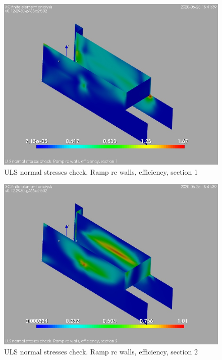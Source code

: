 \begin{figure}
\begin{center}
\includegraphics[width=\linewidth]{ramp_wall/resLC/text/graphics/normStrsULS/wallsCFSect1}
\caption{ULS normal stresses check. Ramp rc walls, efficiency, section 1}
\end{center}
\end{figure}
\begin{figure}
\begin{center}
\includegraphics[width=\linewidth]{ramp_wall/resLC/text/graphics/normStrsULS/wallsCFSect2}
\caption{ULS normal stresses check. Ramp rc walls, efficiency, section 2}
\end{center}
\end{figure}

